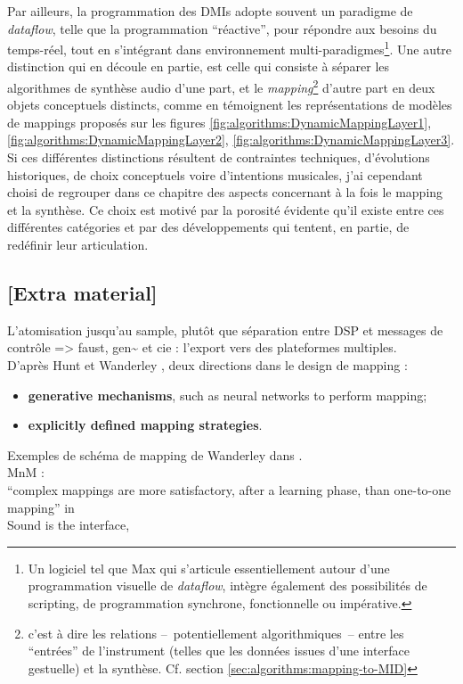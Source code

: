 \indent Par ailleurs, la programmation des \glspl{DMI} adopte souvent un paradigme de \textit{dataflow}, telle que la programmation ``réactive'', pour répondre aux besoins du temps-réel, tout en s'intégrant dans environnement multi-paradigmes\footnote{Un logiciel tel que Max qui s'articule essentiellement autour d'une programmation visuelle de \textit{dataflow}, intègre également des possibilités de scripting, de programmation synchrone, fonctionnelle ou impérative.}. Une autre distinction qui en découle en partie, est celle qui consiste à séparer les algorithmes de synthèse audio d'une part, et le \textit{mapping}\footnote{c'est à dire les relations --~potentiellement algorithmiques~-- entre les ``entrées'' de l'instrument (telles que les données issues d'une interface gestuelle) et la synthèse. Cf. section \ref{sec:algorithms:mapping-to-MID}} d'autre part en deux objets conceptuels distincts, comme en témoignent les représentations de modèles de mappings proposés sur les figures \ref{fig:algorithms:DynamicMappingLayer1}, \ref{fig:algorithms:DynamicMappingLayer2}, \ref{fig:algorithms:DynamicMappingLayer3}.\\
\indent Si ces différentes distinctions résultent de contraintes techniques, d'évolutions historiques, de choix conceptuels voire d'intentions musicales, j'ai cependant choisi de regrouper dans ce chapitre des aspects concernant à la fois le mapping et la synthèse. Ce choix est motivé par la porosité évidente qu'il existe entre ces différentes catégories et par des développements qui tentent, en partie, de redéfinir leur articulation.

\subsection*{[Extra material]}

L’atomisation jusqu’au sample, plutôt que séparation entre DSP et messages de contrôle
=> faust, gen\textasciitilde{ } et cie : l’export vers des plateformes multiples.\\
\indent D'après Hunt et Wanderley \cite{hunt_mapping_2002}, deux directions dans le design de mapping :
\vspace{-1em}
\begin{itemize}[noitemsep]
	\item \textbf{generative mechanisms}, such as neural networks to perform mapping;
	\item \textbf{explicitly defined mapping strategies}.
\end{itemize}
Exemples de schéma de mapping de Wanderley dans \cite{wanderley_escher-modeling_1998}.\\
MnM : \cite{bevilacqua_mnm_2005}\\
``complex mappings are more satisfactory, after a learning phase, than one-to-one mapping'' in \cite{wanderley_mapping_2002}\\
Sound is the interface, \cite{di_scipio_sound_2003}


